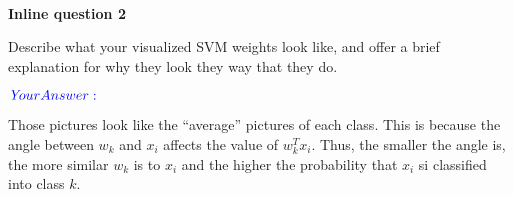 \documentclass[11pt]{article}
\makeatletter
\newcommand{\boxspacing}{\kern\kvtcb@left@rule\kern\kvtcb@boxsep}
\newcommand{\prompt}[4]{
        {\ttfamily\llap{{\color{#2}[#3]:\hspace{3pt}#4}}\vspace{-\baselineskip}}
    }
\makeatother
\begin{document}
    \begin{center}
    \end{center}
    { \hspace*{\fill} \\}
    
    \textbf{Inline question 2}

Describe what your visualized SVM weights look like, and offer a brief
explanation for why they look they way that they do.

\(\color{blue}{\textit Your Answer:}\)

Those pictures look like the ``average'' pictures of each class. This is
because the angle between \(w_k\) and \(x_i\) affects the value of
\(w_k^Tx_i\). Thus, the smaller the angle is, the more similar \(w_k\)
is to \(x_i\) and the higher the probability that \(x_i\) si classified
into class \(k\).

    \begin{tcolorbox}[breakable, size=fbox, boxrule=1pt, pad at break*=1mm,colback=cellbackground, colframe=cellborder]
\prompt{In}{incolor}{18}{\boxspacing}
\begin{Verbatim}[commandchars=\\\{\}]

\end{Verbatim}
\end{tcolorbox}


    
    
    
\end{document}
